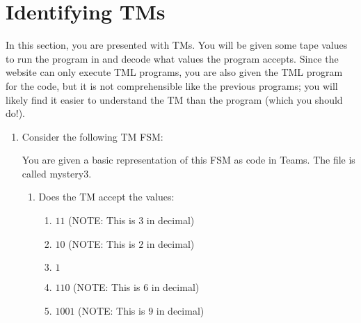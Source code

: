 \section{Identifying TMs}
In this section, you are presented with TMs. You will be given some tape values to run the program in and decode what values the program accepts. Since the website can only execute TML programs, you are also given the TML program for the code, but it is not comprehensible like the previous programs; you will likely find it easier to understand the TM than the program (which you should do!). 
\begin{enumerate}
    \item Consider the following TM FSM:
    \begin{figure}[H]
        \centering
    \end{figure}
    You are given a basic representation of this FSM as code in Teams. The file is called mystery3.
    \begin{enumerate}
        \item Does the TM accept the values:
        \begin{enumerate}
            \item $11$ (NOTE: This is $3$ in decimal)
            \item $10$ (NOTE: This is $2$ in decimal)
            \item $1$
            \item $110$ (NOTE: This is $6$ in decimal)
            \item $1001$ (NOTE: This is $9$ in decimal)
        \end{enumerate}
        

\end{enumerate}
\end{enumerate}
